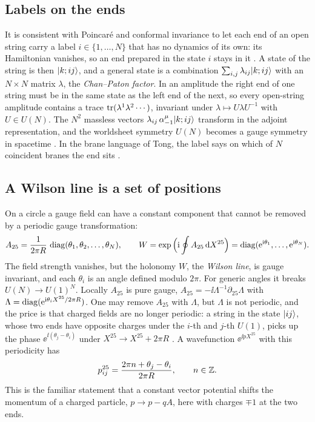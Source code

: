 \subsection{Labels on the ends}

It is consistent with Poincar\'e and conformal invariance to let each end of an open string
carry a label $i\in\{1,\dots,N\}$ that has no dynamics of its own: its Hamiltonian vanishes, so an
end prepared in the state $i$ stays in it . A state of the string is
then $|k;ij\rangle$, and a general state is a combination
$\sum_{i,j}\lambda_{ij}|k;ij\rangle$ with an $N\times N$ matrix $\lambda$, the
\emph{Chan--Paton factor}. In an amplitude the right end of one string
must be in the same state as the left end of the next, so every open-string amplitude contains a
trace $\operatorname{tr}(\lambda^1\lambda^2\cdots)$, invariant under $\lambda\mapsto U\lambda U^{-1}$ with
$U\in U(N)$. The $N^2$ massless vectors $\lambda_{ij}\,\alpha^\mu_{-1}|k;ij\rangle$ transform in the adjoint
representation, and the worldsheet symmetry $U(N)$ becomes a gauge symmetry in spacetime
. In the brane language of Tong, the label says on which of $N$
coincident branes the end sits .

\subsection{A Wilson line is a set of positions}

On a circle a gauge field can have a constant component that cannot be removed by a periodic
gauge transformation:
\begin{equation}\label{eq:dbranes:wilsonA}
 A_{25}=\frac1{2\pi R}\,\operatorname{diag}(\theta_1,\theta_2,\dots,\theta_N),\qquad
 W=\exp\Big(\mathrm{i}\oint A_{25}\,\mathrm{d} X^{25}\Big)=\operatorname{diag}(\mathrm{e}^{\mathrm{i}\theta_1},\dots,\mathrm{e}^{\mathrm{i}\theta_N}) .
\end{equation}
The field strength vanishes, but the holonomy $W$, the \emph{Wilson line}, is
gauge invariant, and each $\theta_i$ is an angle defined modulo $2\pi$. For generic angles it
breaks $U(N)\to U(1)^N$. Locally $A_{25}$ is pure gauge, $A_{25}=-\ii\Lambda^{-1}\partial_{25}\Lambda$
with $\Lambda=\operatorname{diag}(\mathrm{e}^{\mathrm{i}\theta_iX^{25}/2\pi R})$. One may remove $A_{25}$ with $\Lambda$, but
$\Lambda$ is not periodic, and the price is that charged fields are no longer periodic: a string
in the state $|ij\rangle$, whose two ends have opposite charges under the $i$-th and $j$-th
$U(1)$, picks up the phase $\ee^{\ii(\theta_j-\theta_i)}$ under $X^{25}\to X^{25}+2\pi R$
. A wavefunction $\ee^{\ii pX^{25}}$ with this periodicity has
\begin{equation}\label{eq:dbranes:fracp}
 p^{25}_{ij}=\frac{2\pi n+\theta_j-\theta_i}{2\pi R},\qquad n\in\mathbb{Z} .
\end{equation}
This is the familiar statement that a constant vector potential shifts the momentum of a charged
particle, $p\to p-qA$, here with charges $\mp1$ at the two ends.

